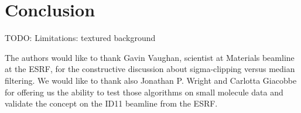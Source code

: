 \documentclass[a4paper,12pt,oneside]{article}              %
\begin{document}
\section{Conclusion}

TODO:
Limitations: textured background




The authors would like to thank Gavin Vaughan, scientist at Materials beamline at the ESRF,  for the constructive discussion about sigma-clipping versus median filtering. 
We would like to thank also Jonathan P. Wright and Carlotta Giacobbe for offering us the ability to test those algorithms on small molecule data and validate the concept on the ID11 beamline from the ESRF.




\end{document}
